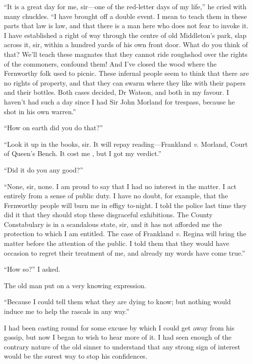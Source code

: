 \documentclass[paper=a5,BCOR=7mm,twoside,DIV=calc,12pt,usegeometry,openany,chapterprefix,endperiod,headings=big]{scrbook} %
\begin{document}
\enquote{It is a great day for me, sir---one of the red-letter days of my life,} he cried with many chuckles. \enquote{I have brought off a double event. I mean to teach them in these parts that law is law, and that there is a man here who does not fear to invoke it. I have established a right of way through the centre of old Middleton's park, slap across it, sir, within a hundred yards of his own front door. What do you think of that? We'll teach these magnates that they cannot ride roughshod over the rights of the commoners, confound them! And I've closed the wood where the Fernworthy folk used to picnic. These infernal people seem to think that there are no rights of property, and that they can swarm where they like with their papers and their bottles. Both cases decided, Dr Watson, and both in my favour. I haven't had such a day since I had Sir John Morland for trespass, because he shot in his own warren.}

\enquote{How on earth did you do that?}

\enquote{Look it up in the books, sir. It will repay reading---Frankland \textit{v.} Morland, Court of Queen's Bench. It cost me , but I got my verdict.}

\enquote{Did it do you any good?}

\enquote{None, sir, none. I am proud to say that I had no interest in the matter. I act entirely from a sense of public duty. I have no doubt, for example, that the Fernworthy people will burn me in effigy to-night. I told the police last time they did it that they should stop these disgraceful exhibitions. The County Constabulary is in a scandalous state, sir, and it has not afforded me the protection to which I am entitled. The case of Frankland \textit{v.} Regina will bring the matter before the attention of the public. I told them that they would have occasion to regret their treatment of me, and already my words have come true.}

\enquote{How so?} I asked.

The old man put on a very knowing expression.

\enquote{Because I could tell them what they are dying to know; but nothing would induce me to help the rascals in any way.}

I had been casting round for some excuse by which I could get away from his gossip, but now I began to wish to hear more of it. I had seen enough of the contrary nature of the old sinner to understand that any strong sign of interest would be the surest way to stop his confidences.
\end{document}
